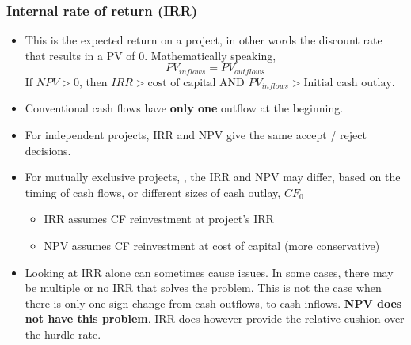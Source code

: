 \documentclass[../notes_compiled.tex]{subfiles}
\begin{document}
\subsubsection{Internal rate of return (IRR)}
\label{irr}
\begin{itemize}
\item This is the expected return on a project, in other words the discount rate that results in a PV of 0. Mathematically speaking, 
\begin{equation*}
PV_{inflows} = PV_{outflows}
\end{equation*}
If $NPV>0$, then $IRR>\text{cost of capital}$ AND $PV_{inflows}>\text{Initial cash outlay}$.
\item Conventional cash flows have \textbf{only one} outflow at the beginning.
\item For independent projects, IRR and NPV give the same accept / reject decisions.
\item For mutually exclusive projects, , the IRR and NPV may differ, based on the timing of cash flows, or different sizes of cash outlay, $CF_{0}$
\begin{itemize}
\item IRR assumes CF reinvestment at project's IRR
\item NPV assumes CF reinvestment at cost of capital (more conservative)
\end{itemize}
\item Looking at IRR alone can sometimes cause issues. In some cases, there may be multiple or no IRR that solves the problem. This is not the case when there is only one sign change from cash outflows, to cash inflows. \textbf{NPV does not have this problem}. IRR does however provide the relative cushion over the hurdle rate.
\end{itemize}
\end{document}
